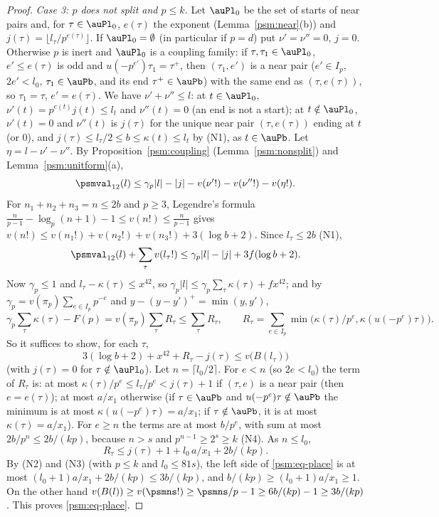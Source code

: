 \documentclass[10pt]{amsart}
\theoremstyle{definition}
\theoremstyle{remark}
\begin{document}
\begin{proof}
\emph{Case 3: $p$ does not split and $p\le k$.} Let $\auPl_0$ be the set of starts of near pairs and,
for $\tau\in\auPl_0$, $e(\tau)$ the exponent (Lemma~\ref{psm:near}(b)) and $j(\tau)=\lfloor l_\tau/
p^{e(\tau)}\rfloor$. If $\auPl_0=\emptyset$ (in particular if $p=d$) put $\nu'=\nu''=0$, $j=0$.
Otherwise $p$ is inert and $\auPl_0$ is a coupling family: if $\tau,\tau_1\in\auPl_0$, $e'\le
e(\tau)$ is odd and $u(-p^{e'})\tau_1=\tau^+$, then $(\tau_1,e')$ is a near pair ($e'\in I_p$,
$2e'<l_0$, $\tau_1\in\auPb$, and its end $\tau^+\in\auPb$) with the same end as $(\tau,e(\tau))$,
so $\tau_1=\tau$, $e'=e(\tau)$. We have $\nu'+\nu''\le l$: at $t\in\auPl_0$, $\nu'(t)=p^{e(t)}j(t)\le
l_t$ and $\nu''(t)=0$ (an end is not a start); at $t\notin\auPl_0$, $\nu'(t)=0$ and $\nu''(t)$ is
$j(\tau)$ for the unique near pair $(\tau,e(\tau))$ ending at $t$ (or $0$), and $j(\tau)\le l_\tau/2
\le b\le\kappa(t)\le l_t$ by (N1), as $t\in\auPb$. Let $\eta=l-\nu'-\nu''$. By
Proposition~\ref{psm:coupling} (Lemma~\ref{psm:nonsplit}) and Lemma~\ref{psm:unitform}(a),
\[
\psmval_{12}(l)\le\gamma_p|l|-|j|-v(\nu'!)-v(\nu''!)-v(\eta!) .
\]
For $n_1+n_2+n_3=n\le2b$ and $p\ge3$, Legendre's formula $\frac n{p-1}-\log_p(n+1)-1\le v(n!)\le
\frac n{p-1}$ gives $v(n!)\le v(n_1!)+v(n_2!)+v(n_3!)+3(\log b+2)$. Since $l_\tau\le2b$ (N1),
\[
\psmval_{12}(l)+\sum_\tau v(l_\tau!)\le\gamma_p|l|-|j|+3f(\log b+2).
\]
Now $\gamma_p\le1$ and $l_\tau-\kappa(\tau)\le x^{42}$, so $\gamma_p|l|\le\gamma_p\sum_\tau
\kappa(\tau)+fx^{42}$; and by $\gamma_p=v(\pi_p)\sum_{e\in I_p}p^{-e}$ {\cite[(18)]{P49}} and
$y-(y-y')^+=\min(y,y')$,
\[
\gamma_p\sum_\tau\kappa(\tau)-F(p)=v(\pi_p)\sum_\tau R_\tau\le\sum_\tau R_\tau,\qquad
R_\tau=\sum_{e\in I_p}\min\bigl(\kappa(\tau)/p^e,\kappa(u(-p^e)\tau)\bigr).
\]
So it suffices to show, for each $\tau$,
\begin{equation}\label{psm:eq-place}
3(\log b+2)+x^{42}+R_\tau-j(\tau)\le v\bigl(B(l_\tau)\bigr)
\end{equation}
(with $j(\tau)=0$ for $\tau\notin\auPl_0$). Let $n=\lceil l_0/2\rceil$. For $e<n$ (so $2e<l_0$) the
term of $R_\tau$ is: at most $\kappa(\tau)/p^{e}\le l_\tau/p^e<j(\tau)+1$ if $(\tau,e)$ is a near pair
(then $e=e(\tau)$); at most $a/x_1$ otherwise (if $\tau\in\auPb$ and $u(-p^e)\tau\notin\auPb$ the
minimum is at most $\kappa(u(-p^e)\tau)=a/x_1$; if $\tau\notin\auPb$, it is at most
$\kappa(\tau)=a/x_1$). For $e\ge n$ the terms are at most $b/p^e$, with sum at most $2b/p^n\le
2b/(kp)$, because $n>s$ and $p^{n-1}\ge2^s\ge k$ (N4). As $n\le l_0$,
\[
R_\tau\le j(\tau)+1+l_0\,a/x_1+2b/(kp).
\]
By (N2) and (N3) (with $p\le k$ and $l_0\le81s$), the left side of \eqref{psm:eq-place} is at most
$(l_0+1)a/x_1+2b/(kp)\le3b/(kp)$, and $b/(kp)\ge(l_0+1)a/x_1\ge1$. On the other hand
$v(B(l))\ge v(\psmns!)\ge\psmns/p-1\ge6b/(kp)-1\ge3b/(kp)$. This proves \eqref{psm:eq-place}.
\end{proof}
\end{document}

